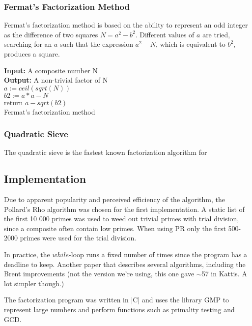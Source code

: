 \documentclass[paper=a4, fontsize=11pt,numbers=endperiod]{scrartcl} %
\numberwithin{equation}{section} %
\numberwithin{figure}{section} %
\numberwithin{table}{section} %
\begin{document}
\subsubsection{Fermat's Factorization Method}
Fermat's factorization method\cite{fermat} is based on the ability to represent an odd integer as the difference of two squares $N = a^2 - b^2$.
Different values of $a$ are tried, searching for an $a$ such that the expression $a^2 - N$, which is equivalent to $b^2$, produces a square.

\begin{algorithm}[H]
 \SetAlgoLined %
 \textbf{Input:} {A composite number N}\\
 \textbf{Output:} {A non-trivial factor of N}\\
 $a := ceil(sqrt(N))$\\
 $b2 := a*a - N$\\
  return $a-sqrt(b2)$\;
  \hspace{0pt}\\
  \caption{Fermat's factorization method \cite{fermat}}
\end{algorithm}

\subsubsection{Quadratic Sieve}
The quadratic sieve \cite{qsieve} is the fastest known factorization algorithm for 

\subsection{Implementation}
Due to apparent popularity and perceived efficiency of the algorithm, the Pollard's Rho algorithm was chosen for the first implementation.
A static list of the first 10 000 primes was used to weed out trivial primes with trial division, since a composite often contain low primes.
When using PR only the first 500-2000 primes were used for the trial division.

In practice, the $while$-loop runs a fixed number of times since the program has a deadline to keep.
Another paper that describes several algorithms, including the Brent improvements (not the version we're using, this one gave $\sim$57 in Kattis.
A lot simpler though.)\cite{otherpaper} %

The factorization program was written in |C| and uses the library GMP\cite{gmp} to represent large numbers and perform functions such as primality testing and GCD.
\end{document}
